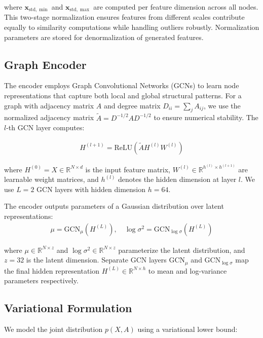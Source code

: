\documentclass[12pt]{article}
\begin{document}
where $\mathbf{x}_{\text{std},\min}$ and $\mathbf{x}_{\text{std},\max}$ are computed per feature dimension across all nodes. This two-stage normalization ensures features from different scales contribute equally to similarity computations while handling outliers robustly. Normalization parameters are stored for denormalization of generated features.

\subsection{Graph Encoder}

The encoder employs Graph Convolutional Networks (GCNs) \cite{kipf2016semi} to learn node representations that capture both local and global structural patterns. For a graph with adjacency matrix $A$ and degree matrix $D_{ii} = \sum_j A_{ij}$, we use the normalized adjacency matrix $\tilde{A} = D^{-1/2}AD^{-1/2}$ to ensure numerical stability. The $l$-th GCN layer computes:

\begin{align}
H^{(l+1)} = \text{ReLU}(\tilde{A}H^{(l)}W^{(l)})
\end{align}

where $H^{(0)} = X \in \mathbb{R}^{N \times d}$ is the input feature matrix, $W^{(l)} \in \mathbb{R}^{h^{(l)} \times h^{(l+1)}}$ are learnable weight matrices, and $h^{(l)}$ denotes the hidden dimension at layer $l$. We use $L=2$ GCN layers with hidden dimension $h=64$.

The encoder outputs parameters of a Gaussian distribution over latent representations:
\begin{align}
\mu = \text{GCN}_{\mu}(H^{(L)}), \quad \log\sigma^2 = \text{GCN}_{\log\sigma}(H^{(L)})
\end{align}

where $\mu \in \mathbb{R}^{N \times z}$ and $\log\sigma^2 \in \mathbb{R}^{N \times z}$ parameterize the latent distribution, and $z=32$ is the latent dimension. Separate GCN layers $\text{GCN}_{\mu}$ and $\text{GCN}_{\log\sigma}$ map the final hidden representation $H^{(L)} \in \mathbb{R}^{N \times h}$ to mean and log-variance parameters respectively.

\subsection{Variational Formulation}

We model the joint distribution $p(X, A)$ using a variational lower bound:
\end{document}
